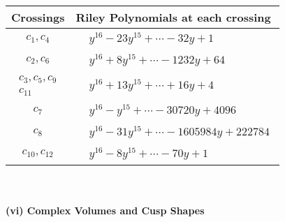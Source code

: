 \documentclass[1p]{elsarticle_modified}
\theoremstyle{definition}
\begin{document}
\begin{tabular}{m{50pt}|m{274pt}}
Crossings & \hspace{64pt}Riley Polynomials at each crossing \\
\hline $$\begin{aligned}c_{1},c_{4}\end{aligned}$$&$\begin{aligned}
&y^{16}-23 y^{15}+\cdots-32 y+1
\end{aligned}$\\
\hline $$\begin{aligned}c_{2},c_{6}\end{aligned}$$&$\begin{aligned}
&y^{16}+8 y^{15}+\cdots-1232 y+64
\end{aligned}$\\
\hline $$\begin{aligned}c_{3},c_{5},c_{9}\\c_{11}\end{aligned}$$&$\begin{aligned}
&y^{16}+13 y^{15}+\cdots+16 y+4
\end{aligned}$\\
\hline $$\begin{aligned}c_{7}\end{aligned}$$&$\begin{aligned}
&y^{16}- y^{15}+\cdots-30720 y+4096
\end{aligned}$\\
\hline $$\begin{aligned}c_{8}\end{aligned}$$&$\begin{aligned}
&y^{16}-31 y^{15}+\cdots-1605984 y+222784
\end{aligned}$\\
\hline $$\begin{aligned}c_{10},c_{12}\end{aligned}$$&$\begin{aligned}
&y^{16}-8 y^{15}+\cdots-70 y+1
\end{aligned}$\\
\hline
\end{tabular}\\~\\
\newpage\flushleft \textbf{(vi) Complex Volumes and Cusp Shapes}
\end{document}
